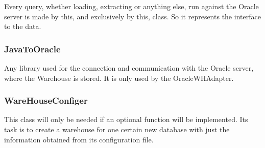 Every query, whether loading, extracting or anything else, run against the Oracle server is made by this,
and exclusively by this, class. So it represents the interface to the data.



\subsubsection*{JavaToOracle}

Any library used for the connection and communication with the Oracle server, 
where the Warehouse is stored. It is only used by the OracleWHAdapter.

 

\subsubsection*{WareHouseConfiger}

This class will only be needed if an optional function will be implemented. Its task is to create
a warehouse for one certain new database with just the information obtained from its configuration file.

